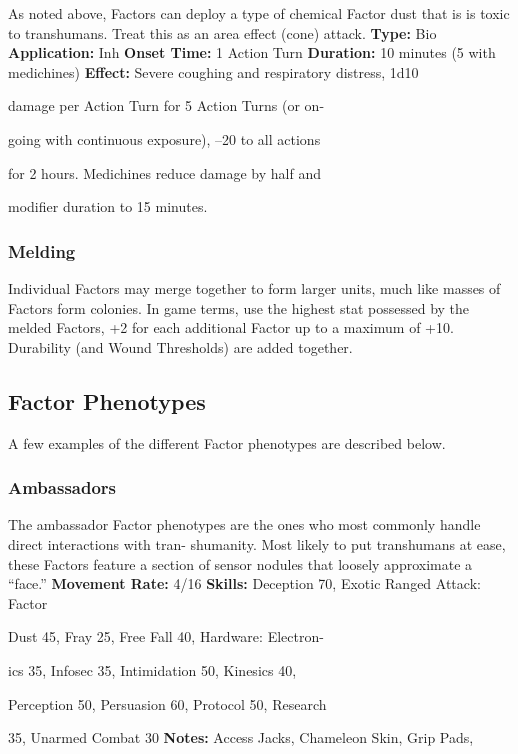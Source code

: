 As noted above, Factors can deploy a type of chemical 
Factor dust that is is toxic to transhumans. Treat this 
as an area effect (cone) attack. 
\textbf{Type:} Bio 
\textbf{Application:} Inh
\textbf{Onset Time:} 1 Action Turn
\textbf{Duration:} 10 minutes (5 with medichines)
\textbf{Effect:} Severe coughing and respiratory distress, 1d10 

damage per Action Turn for 5 Action Turns (or on-

going with continuous exposure), –20 to all actions 

for 2 hours. Medichines reduce damage by half and 

modifier duration to 15 minutes. 

\subsubsection{Melding}

Individual Factors may merge together to form larger 
units, much like masses of Factors form colonies. In 
game terms, use the highest stat possessed by the 
melded Factors, +2 for each additional Factor up to a 
maximum of +10. Durability (and Wound Thresholds) 
are added together.

\subsection{Factor Phenotypes }

A few examples of the different Factor phenotypes are 
described below.

\subsubsection{Ambassadors}

The ambassador Factor phenotypes are the ones who 
most commonly handle direct interactions with tran-
shumanity. Most likely to put transhumans at ease, 
these Factors feature a section of sensor nodules that 
loosely approximate a ``face.''
\textbf{Movement Rate: }4/16\textbf{ }
\textbf{Skills:} Deception 70, Exotic Ranged Attack: Factor 

Dust 45, Fray 25, Free Fall 40, Hardware: Electron-

ics 35, Infosec 35, Intimidation 50, Kinesics 40, 

Perception 50, Persuasion 60, Protocol 50, Research 

35, Unarmed Combat 30
\textbf{Notes:  }Access Jacks, Chameleon Skin, Grip Pads, 

